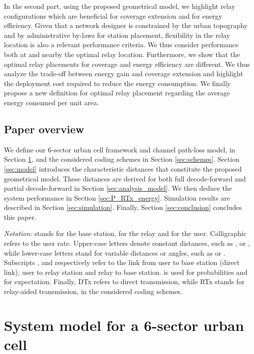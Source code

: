 \documentclass[journal]{IEEEtran}
\theoremstyle{definition}
\begin{document}
In the second part, using the proposed geometrical model, we highlight relay configurations which are beneficial for coverage extension and for energy efficiency. Given that a network designer is constrained by the urban topography and by administrative by-laws for station placement, flexibility in the relay location is also a relevant performance criteria. We thus consider performance both at and nearby the optimal relay location. 
Furthermore, we show that the optimal relay placements for coverage and energy efficiency are different. We thus analyze the trade-off between energy gain and coverage extension and highlight the deployment cost required to reduce the energy consumption. We finally propose a new definition for optimal relay placement regarding the average energy consumed per unit area.





\subsection{Paper overview}

We define our 6-sector urban cell framework and channel path-loss model, in Section \ref{sec:system_model}, and the considered coding schemes in Section \ref{sec:schemes}. Section \ref{sec:model} introduces the characteristic distances that constitute the proposed geometrical model. These distances are derived for both full decode-forward and partial decode-forward in Section \ref{sec:analysis_model}. We then deduce the system performance in Section \ref{sec:P_RTx_energy}.
Simulation results are described in Section \ref{sec:simulation}. Finally, Section \ref{sec:conclusion} concludes this paper.


\textit{Notation:}  stands for the base station,  for the relay and  for the user. Calligraphic  refers to the user rate. Upper-case letters denote constant distances, such as ,  or , while lower-case letters stand for variable distances or angles, such as  or . Subscripts ,  and  respectively refer to the link from user to base station (direct link), user to relay station and relay to base station.  is used for probabilities and  for expectation. Finally, DTx refers to direct transmission, while RTx stands for relay-aided transmission, in the considered coding schemes.



\section{System model for a 6-sector urban cell}
\label{sec:system_model}
\end{document}
